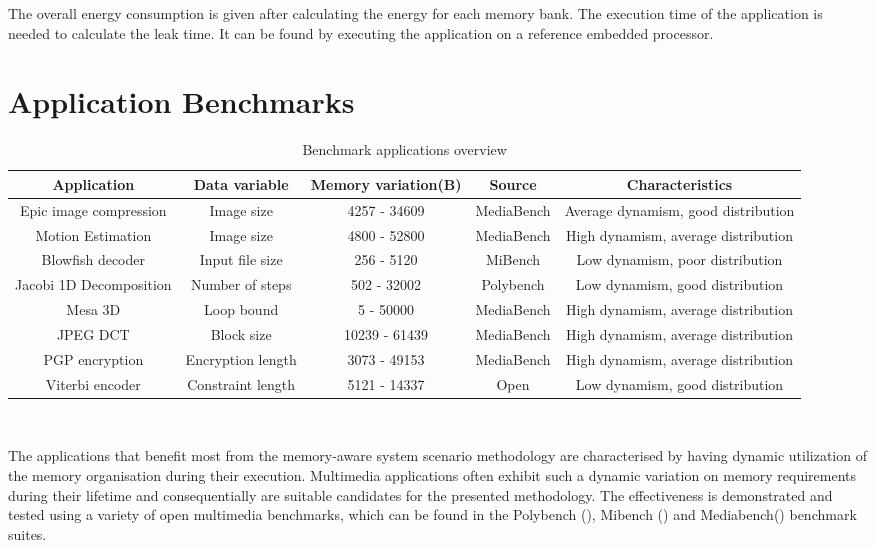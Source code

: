 \documentclass{acm_proc_article-sp}
\begin{document}
 The overall energy consumption is given after calculating the energy for each memory bank. The execution time of the application is needed to calculate the leak time. It can be found by executing the application on a reference embedded processor.   
 
\section{Application Benchmarks}
\label{sec:applications}

\begin{center}
\begin{table*}[!t]
\caption{Benchmark applications overview}
\label{tab:applications}
{\small
\hfill{}
\begin{tabular}{|c|c|c|c|c|}
\hline 
\textbf{Application} & \textbf{Data variable} & \textbf{Memory variation(B)} & \textbf{Source} & \textbf{Characteristics}\\ 
\hline 
Epic image compression & Image size & 4257 - 34609 & MediaBench & Average dynamism, good distribution\\ 
\hline 
Motion Estimation & Image size & 4800 - 52800 & MediaBench & High dynamism, average distribution\\ 
\hline 
Blowfish decoder & Input file size & 256 - 5120 & MiBench & Low dynamism, poor distribution\\ 
\hline 
Jacobi 1D Decomposition & Number of steps & 502 - 32002 & Polybench & Low dynamism, good distribution\\ 
\hline 
Mesa 3D & Loop bound & 5 - 50000 & MediaBench & High dynamism, average distribution\\ 
\hline 
JPEG DCT & Block size & 10239 - 61439 & MediaBench & High dynamism, average distribution\\ 
\hline 
PGP encryption & Encryption length & 3073 - 49153 & MediaBench & High dynamism, average distribution\\ 
\hline 
Viterbi encoder & Constraint length & 5121 - 14337 & Open & Low dynamism, good distribution\\ 
\hline 
\end{tabular}}
\hfill{}
\\
\end{table*}
\end{center}

The applications that benefit most from the memory-aware system scenario methodology are characterised by having dynamic utilization of the memory organisation during their execution. Multimedia applications often exhibit such a dynamic variation on memory requirements during their lifetime and consequentially are suitable candidates for the presented methodology. The effectiveness is demonstrated and tested using a variety of open multimedia benchmarks, which can be found in the Polybench (\cite{Poly}), Mibench (\cite{mibench}) and Mediabench(\cite{mediabench}) benchmark suites. 
\end{document}
